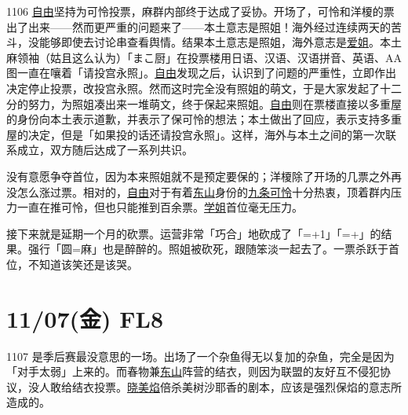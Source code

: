 1106 \uline{自由}坚持为可怜投票，麻群内部终于达成了妥协。开场了，可怜和洋榎的票出了出来——然而更严重的问题来了——本土意志是照姐！海外经过连续两天的苦斗，没能够即使去讨论串查看舆情。结果本土意志是照姐，海外意志是\uline{爱姐}。本土麻领袖（姑且这么认为）「まこ厨」在投票楼用日语、汉语、汉语拼音、英语、AA图一直在嚷着「请投宫永照」。\uline{自由}发现之后，认识到了问题的严重性，立即作出决定停止投票，改投宫永照。然而这时完全没有照姐的萌文，于是大家发起了十二分的努力，为照姐凑出来一堆萌文，终于保起来照姐。\uline{自由}则在票楼直接以多重屋的身份向本土表示道歉，并表示了保可怜的想法；本土做出了回应，表示支持多重屋的决定，但是「如果投的话还请投宫永照」。这样，海外与本土之间的第一次联系成立，双方随后达成了一系列共识。

没有意愿争夺首位，因为本来照姐就不是预定要保的；洋榎除了开场的几票之外再没怎么涨过票。相对的，\uline{自由}对于有着\uline{东山}身份的\uline{九条可怜}十分热衷，顶着群内压力一直在推可怜，但也只能推到百余票。\uline{学姐}首位毫无压力。

接下来就是延期一个月的砍票。运营非常「巧合」地砍成了「=+1」「=+」的结果。强行「圆=麻」也是醉醉的。照姐被砍死，跟随笨淡一起去了。一票杀跃于首位，不知道该笑还是该哭。

\section{11/07(金) FL8}


1107 是季后赛最没意思的一场。出场了一个杂鱼得无以复加的杂鱼，完全是因为「对手太弱」上来的。而春物兼\uline{东山}阵营的结衣，则因为联盟的友好互不侵犯协议，没人敢给结衣投票。\uline{晓美焰}倍杀美树沙耶香的剧本，应该是强烈保焰的意志所造成的。

